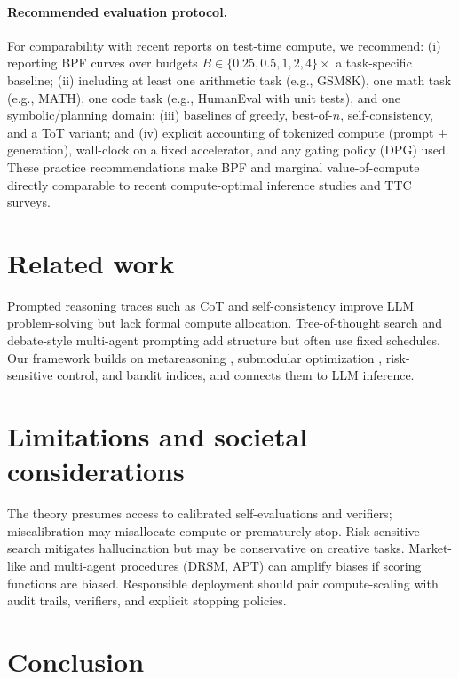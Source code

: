 \documentclass[11pt]{article}
\newcommand{\1}{\mathbb{I}}
\begin{document}
\paragraph{Recommended evaluation protocol.}
For comparability with recent reports on test-time compute, we recommend: (i) reporting BPF curves over budgets
$B \in \{0.25, 0.5, 1, 2, 4\}\times$ a task-specific baseline; (ii) including at least one arithmetic task
(e.g., GSM8K), one math task (e.g., MATH), one code task (e.g., HumanEval with unit tests), and one symbolic/planning domain;
(iii) baselines of greedy, best-of-$n$, self-consistency, and a ToT variant; and (iv) explicit accounting of
tokenized compute (prompt + generation), wall-clock on a fixed accelerator, and any gating policy (DPG) used.
These practice recommendations make BPF and marginal value-of-compute directly comparable to recent
compute-optimal inference studies and TTC surveys.

\section{Related work}

Prompted reasoning traces such as CoT \cite{wei2022cot} and self-consistency \cite{wang2023selfconsistency} improve LLM problem-solving but lack formal compute allocation.
Tree-of-thought search \cite{yao2023tot} and debate-style multi-agent prompting \cite{irving2018debate} add structure but often use fixed schedules.
Our framework builds on metareasoning \cite{russellwefald1991,horvitz1989,liedergriffiths2020}, submodular optimization \cite{nemhauser1978}, risk-sensitive control, and bandit indices, and connects them to LLM inference.

\section{Limitations and societal considerations}

The theory presumes access to calibrated self-evaluations and verifiers; miscalibration may misallocate compute or prematurely stop. 
Risk-sensitive search mitigates hallucination but may be conservative on creative tasks. 
Market-like and multi-agent procedures (DRSM, APT) can amplify biases if scoring functions are biased. 
Responsible deployment should pair compute-scaling with audit trails, verifiers, and explicit stopping policies.

\section{Conclusion}
\end{document}

